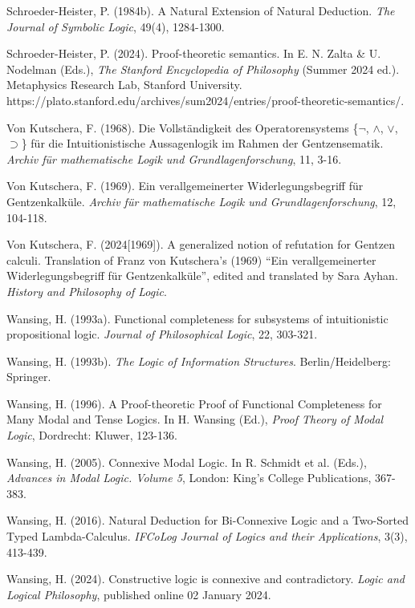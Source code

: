 \documentclass{article}%
\theoremstyle{break}
\begin{document}
\begin{thebibliography}{}
 Schroeder-Heister, P. (1984b). A Natural Extension of Natural Deduction. {\em The Journal of Symbolic Logic}, 49(4), 1284-1300.  

 Schroeder-Heister, P. (2024). Proof-theoretic semantics. In E. N. Zalta \& U. Nodelman (Eds.), \textit{The Stanford Encyclopedia of Philosophy} (Summer 2024 ed.). Metaphysics Research Lab, Stanford University. https://plato.stanford.edu/archives/sum2024/entries/proof-theoretic-semantics/.

 Von Kutschera, F. (1968). Die Vollständigkeit des Operatorensystems \{$\neg$, $\wedge$, $\vee$, $\supset$\} für die Intuitionistische Aussagenlogik im Rahmen der Gentzensematik. {\em Archiv  f\"ur mathematische Logik und Grundlagenforschung}, 11, 3-16. 

 Von Kutschera, F. (1969). Ein verallgemeinerter Widerlegungsbegriff f\"ur Gentzen\-kalk\"ule. {\em Archiv  f\"ur mathematische Logik und Grundlagenforschung}, 12, 104-118.

 Von Kutschera, F. (2024[1969]). A generalized notion of refutation for Gentzen calculi. Translation of Franz von Kutschera’s (1969) ``Ein verallgemeinerter Widerlegungsbegriff f\"ur Gentzen\-kalk\"ule'', edited and translated by Sara Ayhan. {\em History and Philosophy of Logic}.

 Wansing, H. (1993a). Functional completeness for subsystems of intuitionistic propositional logic. {\em Journal of Philosophical Logic}, 22, 303-321. 

 Wansing, H. (1993b). {\em The Logic of Information Structures}. Berlin/Heidelberg: Springer. 


 Wansing, H. (1996). A Proof-theoretic Proof of Functional Completeness for Many Modal and Tense Logics. In H. Wansing (Ed.), {\em Proof Theory of Modal Logic}, Dordrecht: Kluwer, 123-136.

 Wansing, H. (2005). Connexive Modal Logic. In R. Schmidt et al. (Eds.),  {\em Advances in Modal Logic. Volume 5}, London: King’s College Publications, 367-383.


 Wansing, H. (2016). Natural Deduction for Bi-Connexive Logic and a Two-Sorted Typed Lambda-Calculus. {\em IFCoLog Journal of Logics and their Applications}, 3(3), 413-439. 

 Wansing, H. (2024). Constructive logic is connexive and contradictory. {\em Logic and Logical Philosophy}, published online 02 January 2024. 



\end{thebibliography}
\end{document}
